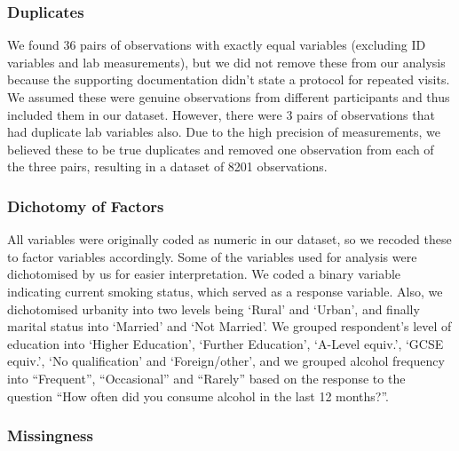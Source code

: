 \documentclass[
  11pt,
  twocolumn]{article}
\begin{document}
\subsubsection{Duplicates}\label{duplicates}

We found 36 pairs of observations with exactly equal variables
(excluding ID variables and lab measurements), but we did not remove
these from our analysis because the supporting documentation didn't
state a protocol for repeated visits. We assumed these were genuine
observations from different participants and thus included them in our
dataset. However, there were 3 pairs of observations that had duplicate
lab variables also. Due to the high precision of measurements, we
believed these to be true duplicates and removed one observation from
each of the three pairs, resulting in a dataset of 8201 observations.

\subsubsection{Dichotomy of Factors}\label{dichotomy-of-factors}

All variables were originally coded as numeric in our dataset, so we
recoded these to factor variables accordingly. Some of the variables
used for analysis were dichotomised by us for easier interpretation. We
coded a binary variable indicating current smoking status, which served
as a response variable. Also, we dichotomised urbanity into two levels
being `Rural' and `Urban', and finally marital status into `Married' and
`Not Married'. We grouped respondent's level of education into `Higher
Education', `Further Education', `A-Level equiv.', `GCSE equiv.', `No
qualification' and `Foreign/other', and we grouped alcohol frequency
into ``Frequent'', ``Occasional'' and ``Rarely'' based on the response
to the question ``How often did you consume alcohol in the last 12
months?''.

\subsubsection{Missingness}\label{missingness}
\end{document}
